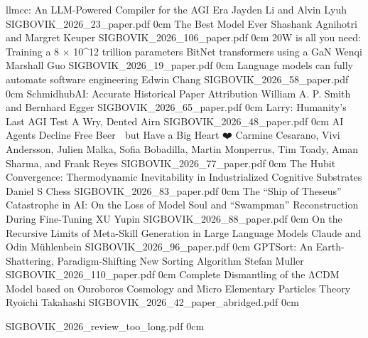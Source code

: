 \addpaper
	{llmcc: An LLM-Powered Compiler for the AGI Era}
	{Jayden Li and Alvin Lyuh}
	{}
	{SIGBOVIK_2026_23_paper.pdf}
	{0cm}
	{}
\addpaper
	{The Best Model Ever}
	{Shashank Agnihotri and Margret Keuper}
	{}
	{SIGBOVIK_2026_106_paper.pdf}
	{0cm}
	{}
\addpaper
	{20W is all you need: Training a 8 × 10^12 trillion parameters BitNet transformers using a GaN}
	{Wenqi Marshall Guo}
	{}
	{SIGBOVIK_2026_19_paper.pdf}
	{0cm}
	{}
\addpaper
	{Language models can fully automate software engineering}
	{Edwin Chang}
	{}
	{SIGBOVIK_2026_58_paper.pdf}
	{0cm}
	{}
\addpaper
	{SchmidhubAI: Accurate Historical Paper Attribution}
	{William A. P. Smith and Bernhard Egger}
	{}
	{SIGBOVIK_2026_65_paper.pdf}
	{0cm}
	{}
\addpaper
	{Larry: Humanity's Last AGI Test}
	{A Wry, Dented Airn}
	{}
	{SIGBOVIK_2026_48_paper.pdf}
	{0cm}
	{}
\addpaper
	{AI Agents Decline Free Beer 🍺 but Have a Big Heart ❤️}
	{Carmine Cesarano, Vivi Andersson, Julien Malka, Sofia Bobadilla, Martin Monperrus, Tim Toady, Aman Sharma, and Frank Reyes}
	{}
	{SIGBOVIK_2026_77_paper.pdf}
	{0cm}
	{}
\addpaper
	{The Hubit Convergence: Thermodynamic Inevitability in Industrialized Cognitive Substrates}
	{Daniel S Chess}
	{}
	{SIGBOVIK_2026_83_paper.pdf}
	{0cm}
	{}
\addpaper
	{The “Ship of Theseus” Catastrophe in AI: On the Loss of Model Soul and “Swampman” Reconstruction During Fine-Tuning}
	{XU Yupin}
	{}
	{SIGBOVIK_2026_88_paper.pdf}
	{0cm}
	{}
\addpaper
	{On the Recursive Limits of Meta-Skill Generation in Large Language Models}
	{Claude and Odin Mühlenbein}
	{}
	{SIGBOVIK_2026_96_paper.pdf}
	{0cm}
	{}
\addpaper
	{GPTSort: An Earth-Shattering, Paradigm-Shifting New Sorting Algorithm}
	{Stefan Muller}
	{}
	{SIGBOVIK_2026_110_paper.pdf}
	{0cm}
	{}
\addpaper
	{Complete Dismantling of the ΛCDM Model based on Ouroboros Cosmology and Micro Elementary Particles Theory}
	{Ryoichi Takahashi}
	{}
	{SIGBOVIK_2026_42_paper_abridged.pdf}
	{0cm}
	{}

\addreview
	{SIGBOVIK_2026_review_too_long.pdf}
	{0cm}


